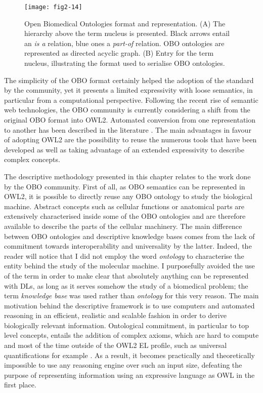 \begin{figure}[ht]
    \centering
    \texttt{[image: fig2-14]}
    \caption{Open Biomedical Ontologies format and representation. (A) The hierarchy above the term nucleus is presented. Black arrows entail an \emph{is a} relation, blue ones a \emph{part-of} relation. OBO ontologies are represented as directed acyclic graph. (B) Entry for the term nucleus, illustrating the format used to serialise OBO ontologies.}
    \label{fig2-14}
\end{figure}

The simplicity of the OBO format certainly helped the adoption of the standard by the community, yet it presents a limited expressivity with loose semantics, in particular from a computational perspective. Following the recent rise of semantic web technologies, the OBO community is currently considering a shift from the original OBO format into OWL2. Automated conversion from one representation to another has been  described in the literature \citep{tirmizi2011mapping} \citep{hoehndorf2010relations}. The main advantages in favour of adopting OWL2 are the possibility to reuse the numerous tools that have been developed as well as taking advantage of an extended expressivity to describe complex concepts.

The descriptive methodology presented in this chapter relates to the work done by the OBO community. First of all, as OBO semantics can be represented in OWL2, it is possible to directly reuse any OBO ontology to study the biological machine. Abstract concepts such as cellular functions or anatomical parts are extensively characterised inside some of the OBO ontologies and are therefore available to describe the parts of the cellular machinery. The main difference between OBO ontologies and descriptive knowledge bases comes from the lack of commitment towards interoperability and universality by the latter. Indeed, the reader will notice that I did not employ the word \emph{ontology} to characterise the entity behind the study of the molecular machine. I purposefully avoided the use of the term in order to make clear that absolutely anything can be represented with DLs, as long as it serves somehow the study of a biomedical problem; the term \emph{knowledge base} was used rather than \emph{ontology} for this very reason. The main motivation behind the descriptive framework is to use computers and automated reasoning in an efficient, realistic and scalable fashion in order to derive biologically relevant information. Ontological commitment, in particular to top level concepts, entails the addition of complex axioms, which are hard to compute and most of the time outside of the OWL2 EL profile, such as universal quantifications for example \citep{krotzsch2012owl}. As a result, it becomes practically and theoretically impossible to use any reasoning engine over such an input size, defeating the purpose of representing information using an expressive language as OWL in the first place.

